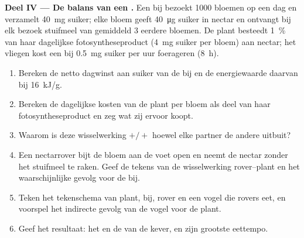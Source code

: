 \begin{problem}
\medskip
\noindent\textbf{Deel IV --- De balans van een .}
Een bij bezoekt 1000 bloemen op een dag en verzamelt \qty{40}{mg} suiker;
elke bloem geeft \qty{40}{\micro g} suiker in nectar en ontvangt bij elk
bezoek stuifmeel van gemiddeld 3 eerdere bloemen. De plant besteedt
\qty{1}{\%} van haar dagelijkse fotosyntheseproduct (\qty{4}{mg} suiker per
bloem) aan nectar; het vliegen kost een bij \qty{0.5}{mg} suiker per uur
foerageren (\qty{8}{h}).
\begin{enumerate}[resume]
  \item Bereken de netto dagwinst aan suiker van de bij en de
        energiewaarde daarvan bij \qty{16}{kJ/g}.
  \item Bereken de dagelijkse kosten van de plant per bloem als deel van
        haar fotosyntheseproduct en zeg wat zij ervoor koopt.
  \item Waarom is deze wisselwerking $+/+$ hoewel elke partner de andere
        uitbuit?
  \item Een nectarrover bijt de bloem aan de voet open en neemt de nectar
        zonder het stuifmeel te raken. Geef de tekens van de wisselwerking
        rover--plant en het waarschijnlijke gevolg voor de bij.
  \item Teken het tekenschema van plant, bij, rover en een vogel die
        rovers eet, en voorspel het indirecte gevolg van de vogel voor de
        plant.
  \item Geef het resultaat: het  en de  van de
        kever, en zijn grootste eettempo.
\end{enumerate}
\end{problem}
